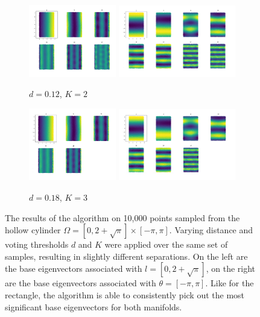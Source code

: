 \documentclass{article}
\numberwithin{equation}{section}
\theoremstyle{definition}
\begin{document}
\begin{figure} 
    \centering
    \begin{subfigure}[t]{\textwidth}
        \centering
        \includegraphics[width=0.42\textwidth]{images/manifold1_line_circle2.png}
        \includegraphics[width=0.56\textwidth]{images/manifold2_line_circle2.png}
        \caption{$d=0.12$, $K=2$}
    \end{subfigure}
    \begin{subfigure}[t]{\textwidth}
        \centering
        \includegraphics[width=0.42\textwidth]{images/manifold1_line_circle3.png}
        \includegraphics[width=0.56\textwidth]{images/manifold2_line_circle3.png}
        \caption{$d=0.18$, $K=3$}
    \end{subfigure}
    \caption{The results of the algorithm on 10,000 points sampled from the hollow cylinder $\Omega = [0, 2 + \sqrt{\pi}] \times [-\pi, \pi]$. Varying distance and voting thresholds $d$ and $K$ were applied over the same set of samples, resulting in slightly different separations. On the left are the base eigenvectors associated with $l = [0, 2 + \sqrt{\pi}]$, on the right are the base eigenvectors associated with $\theta = [-\pi,\pi]$. Like for the rectangle, the algorithm is able to consistently pick out the most significant base eigenvectors for both manifolds.}
    \label{fig:cylinder}
\end{figure}
\end{document}
